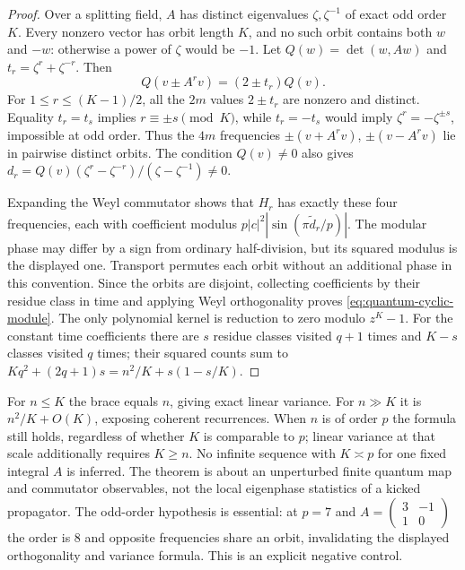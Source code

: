 \begin{proof}
Over a splitting field, $A$ has distinct eigenvalues $\zeta,\zeta^{-1}$ of
exact odd order $K$. Every nonzero vector has orbit length $K$, and no such
orbit contains both $w$ and $-w$: otherwise a power of $\zeta$ would be $-1$.
Let $Q(w)=\det(w,Aw)$ and $t_r=\zeta^r+\zeta^{-r}$. Then
\[
 Q(v\pm A^rv)=(2\pm t_r)Q(v).
\]
For $1\le r\le(K-1)/2$, all the $2m$ values $2\pm t_r$ are nonzero and
distinct. Equality $t_r=t_s$ implies $r\equiv\pm s\pmod K$, while
$t_r=-t_s$ would imply $\zeta^r=-\zeta^{\pm s}$, impossible at odd order.
Thus the $4m$ frequencies $\pm(v+A^rv)$, $\pm(v-A^rv)$ lie in pairwise
distinct orbits. The condition $Q(v)\ne0$ also gives
$d_r=Q(v)(\zeta^r-\zeta^{-r})/(\zeta-\zeta^{-1})\ne0$.

Expanding the Weyl commutator shows that $H_r$ has exactly these four
frequencies, each with coefficient modulus
$p|c|^2|\sin(\pi\widetilde d_r/p)|$. The modular phase may differ by a
sign from ordinary half-division, but its squared modulus is the displayed
one. Transport permutes each orbit without an additional phase in this
convention. Since the orbits are disjoint, collecting coefficients by their
residue class in time and applying Weyl orthogonality proves
\eqref{eq:quantum-cyclic-module}. The only polynomial kernel is reduction to
zero modulo $z^K-1$. For the constant time coefficients there are $s$ residue
classes visited $q+1$ times and $K-s$ classes visited $q$ times; their squared
counts sum to $Kq^2+(2q+1)s=n^2/K+s(1-s/K)$.
\end{proof}
For $n\le K$ the brace equals $n$, giving exact linear variance. For $n\gg K$
it is $n^2/K+O(K)$, exposing coherent recurrences. When $n$ is of order $p$
the formula still holds, regardless of whether $K$ is comparable to $p$;
linear variance at that scale additionally requires $K\ge n$.
No infinite sequence with $K\asymp p$ for one fixed integral $A$ is inferred.
The theorem is about an unperturbed finite quantum map and commutator
observables, not the local eigenphase statistics of a kicked propagator.
The odd-order hypothesis is essential: at $p=7$ and
$A=\left(\begin{smallmatrix}3&-1\\1&0\end{smallmatrix}\right)$ the order is
$8$ and opposite frequencies share an orbit, invalidating the displayed
orthogonality and variance formula. This is an explicit negative control.


